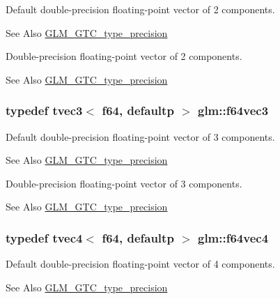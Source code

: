 Default double-\/precision floating-\/point vector of 2 components. \begin{DoxySeeAlso}{See Also}
\hyperlink{group__gtc__type__precision}{G\-L\-M\-\_\-\-G\-T\-C\-\_\-type\-\_\-precision}
\end{DoxySeeAlso}
Double-\/precision floating-\/point vector of 2 components. \begin{DoxySeeAlso}{See Also}
\hyperlink{group__gtc__type__precision}{G\-L\-M\-\_\-\-G\-T\-C\-\_\-type\-\_\-precision} 
\end{DoxySeeAlso}
\hypertarget{group__gtc__type__precision_gac531875c6544b7919f36a86cbe538736}{
\subsubsection[{f64vec3}]{\setlength{\rightskip}{0pt plus 5cm}typedef tvec3$<$ f64, defaultp $>$ {\bf glm\-::f64vec3}}}\label{group__gtc__type__precision_gac531875c6544b7919f36a86cbe538736}
Default double-\/precision floating-\/point vector of 3 components. \begin{DoxySeeAlso}{See Also}
\hyperlink{group__gtc__type__precision}{G\-L\-M\-\_\-\-G\-T\-C\-\_\-type\-\_\-precision}
\end{DoxySeeAlso}
Double-\/precision floating-\/point vector of 3 components. \begin{DoxySeeAlso}{See Also}
\hyperlink{group__gtc__type__precision}{G\-L\-M\-\_\-\-G\-T\-C\-\_\-type\-\_\-precision} 
\end{DoxySeeAlso}
\hypertarget{group__gtc__type__precision_ga9d896f484039b22873e7bfb9e06f7b47}{
\subsubsection[{f64vec4}]{\setlength{\rightskip}{0pt plus 5cm}typedef tvec4$<$ f64, defaultp $>$ {\bf glm\-::f64vec4}}}\label{group__gtc__type__precision_ga9d896f484039b22873e7bfb9e06f7b47}
Default double-\/precision floating-\/point vector of 4 components. \begin{DoxySeeAlso}{See Also}
\hyperlink{group__gtc__type__precision}{G\-L\-M\-\_\-\-G\-T\-C\-\_\-type\-\_\-precision}
\end{DoxySeeAlso}
